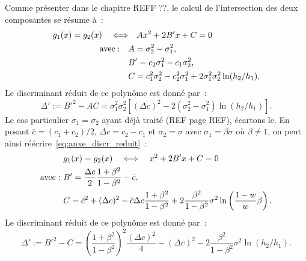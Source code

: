 \documentclass[main.tex]{subfiles}
\begin{document}
Comme présenter dans le chapitre REFF ??, le calcul de l'intersection des deux composantes se résume à~:
\begin{equation}
\begin{aligned}
\label{eq:anxe_polynome}
g_1(x)=g_2(x) \quad \Longleftrightarrow & \quad  Ax^2 + 2B'x + C =0 \\
{\rm avec :} \quad &A=\sigma_2^2 - \sigma_1^2, \\
& B'=c_2\sigma_1^2-c_1\sigma_2^2,\\
& C= c_1^2\sigma_2^2-c_2^2\sigma_1^2 +  2\sigma_1^2\sigma_2^2 \ln( h_2 / h_1 ).
\end{aligned}
\end{equation}
Le discriminant réduit de ce polynôme est donné par~:
\begin{equation}
\label{eq:anxe_discr_reduit}
\Delta' := B'^2 - AC = \sigma_1^2 \sigma_2^2 \left[ (\Delta c)^2 - 2(\sigma_2^2-\sigma_1^2) \ln (h_2/h_1)  \right].
\end{equation}
Le cas particulier $\sigma_1 = \sigma_2$ ayant déjà traité (\cf REF page REF), écartons le. 
En posant $\bar{c}=(c_1+c_2)/2$, $\Delta c = c_2-c_1$ et $\sigma_2=\sigma$ avec $\sigma_1=\beta \sigma$ où $\beta\neq 1$, on peut ainsi réécrire~\ref{eq:anxe_discr_reduit}~:
%
\begin{equation}
\begin{aligned}
\label{eq:anxe_polynome3}
&g_1(x)=g_2(x) \quad \Longleftrightarrow  \quad  x^2 + 2B'x + C =0 \\
{\rm avec :}\ & B'=\frac{\Delta c}{2} \frac{1+\beta^2}{1-\beta^2}-\bar{c},\\
& C= \bar{c}^2+(\Delta c)^2 -\bar{c}\Delta c \frac{1+\beta^2}{1-\beta^2} + 2 \frac{\beta^2}{1-\beta^2} \sigma^2 \ln \left( \frac{1-w}{w}\beta \right).
\end{aligned}
\end{equation}
Le discriminant réduit de ce polynôme est donné par~:
\begin{equation}
\label{eq:anxe_discr_reduit}
\Delta' := B'^2 - C = \left( \frac{1+\beta^2}{1-\beta^2} \right)^2 \frac{(\Delta c)^2}{4} - (\Delta c)^2  - 2 \frac{\beta^2}{1-\beta^2} \sigma^2 \ln (h_2/h_1).
\end{equation}
\end{document}
